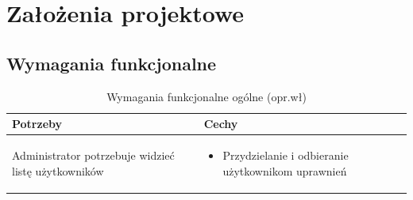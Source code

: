 \chapter{Założenia projektowe}
\section{Wymagania funkcjonalne}


\begin{minipage}{\textwidth}
    \begin{table}[H]
        \centering\caption{Wymagania funkcjonalne ogólne (opr.wł)\label{tabela:wymaganiaFunkcjonalneOgolne}}
        \begin{tabular}{|p{}|p{}|}
            \hline
            Potrzeby & Cechy \\

            \hline
            Administrator potrzebuje widzieć listę użytkowników &
            \begin{itemize}
                \item Przydzielanie i odbieranie użytkownikom uprawnień
            \end{itemize} \\
            \hline
        \end{tabular}
    \end{table}
\end{minipage}

